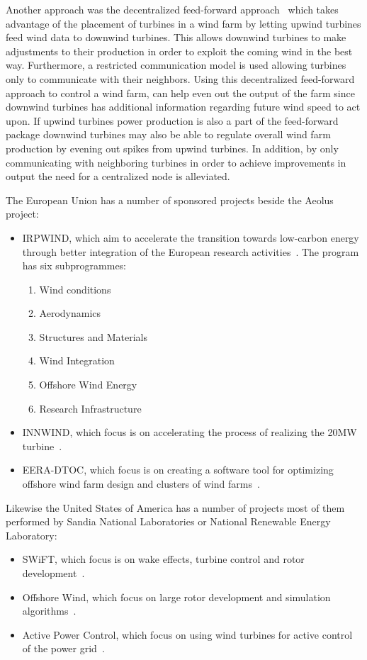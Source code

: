 Another approach was the decentralized feed-forward approach~\cite{DecentralisedFeedforwardControlOfWindFarms} which takes advantage of the placement of turbines in a wind farm by letting upwind turbines feed wind data to downwind turbines. 
This allows downwind turbines to make adjustments to their production in order to exploit the coming wind in the best way.
Furthermore, a restricted communication model is used allowing turbines only to communicate with their neighbors.
Using this decentralized feed-forward approach to control a wind farm, can help even out the output of the farm since downwind turbines has additional information regarding future wind speed to act upon. If upwind turbines power production is also a part of the feed-forward package downwind turbines may also be able to regulate overall wind farm production by evening out spikes from upwind turbines.
In addition, by only communicating with neighboring turbines in order to achieve improvements in output the need for a centralized node is alleviated.

The European Union has a number of sponsored projects beside the Aeolus project:
\begin{itemize}
	\item IRPWIND, which aim to accelerate the transition towards low-carbon energy through better integration of the European research activities~\cite{IRPWIND}. The program has six subprogrammes:
	\begin{enumerate}
		\item Wind conditions
		\item Aerodynamics
		\item Structures and Materials
		\item Wind Integration
		\item Offshore Wind Energy
		\item Research Infrastructure
	\end{enumerate}
	\item INNWIND, which focus is on accelerating the process of realizing the 20MW turbine~\cite{INNWIND}.
	\item EERA-DTOC, which focus is on creating a software tool for optimizing offshore wind farm design and clusters of wind farms~\cite{eera-dtoc}.
\end{itemize}

Likewise the  United States of America has a number of projects most of them performed by Sandia National Laboratories or National Renewable Energy Laboratory:
\begin{itemize}
	\item SWiFT, which focus is on wake effects, turbine control and rotor development~\cite{SWiFT}.
	\item Offshore Wind, which focus on large rotor development and simulation algorithms~\cite{offshoreWind}.
	\item Active Power Control, which focus on using wind turbines for active control of the power grid~\cite{activePowerControl}.
\end{itemize}

